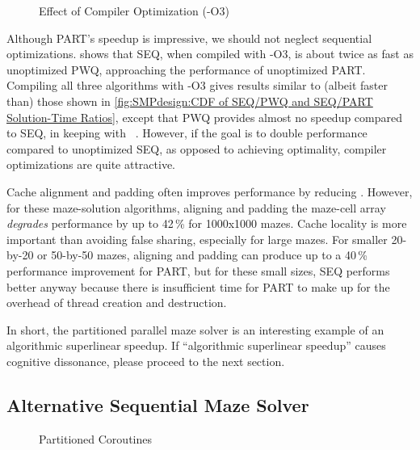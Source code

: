 \begin{figure}
\centering
{}
\caption{Effect of Compiler Optimization (-O3)}
\label{fig:SMPdesign:Effect of Compiler Optimization (-O3)}
\end{figure}

Although PART's speedup is impressive, we should not neglect sequential
optimizations.
 shows that
SEQ, when compiled with -O3, is about twice as fast
as unoptimized PWQ, approaching the performance of unoptimized PART\@.
Compiling all three algorithms with -O3 gives results similar to
(albeit faster than) those shown in
\cref{fig:SMPdesign:CDF of SEQ/PWQ and SEQ/PART Solution-Time Ratios},
except that PWQ provides almost no speedup compared
to SEQ, in keeping with ~\cite{GeneAmdahl1967AmdahlsLaw}.
However, if the goal is to double performance compared to unoptimized
SEQ, as opposed to achieving optimality, compiler
optimizations are quite attractive.

Cache alignment and padding often improves performance by reducing
.
However, for these maze-solution algorithms, aligning and padding the
maze-cell array \emph{degrades} performance by up to 42\,\% for 1000x1000 mazes.
Cache locality is more important than avoiding
false sharing, especially for large mazes.
For smaller 20-by-20 or 50-by-50 mazes, aligning and padding can produce
up to a 40\,\% performance improvement for PART,
but for these small sizes, SEQ performs better anyway because there
is insufficient time for PART to make up for the overhead of
thread creation and destruction.

In short, the partitioned parallel maze solver is an interesting example
of an algorithmic superlinear speedup.
If ``algorithmic superlinear speedup'' causes cognitive dissonance,
please proceed to the next section.

\subsection{Alternative Sequential Maze Solver}
\label{sec:SMPdesign:Alternative Sequential Maze Solver}

\begin{figure}
\centering
{}
\caption{Partitioned Coroutines}
\label{fig:SMPdesign:Partitioned Coroutines}
\end{figure}

